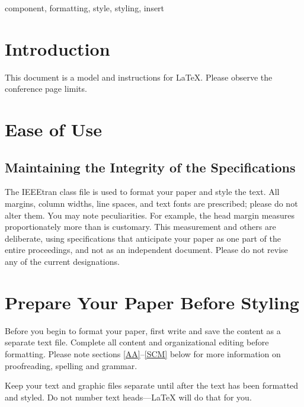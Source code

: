 \documentclass[conference]{IEEEtran}
\begin{document}
\begin{abstract}
    This document is a model and instructions for \LaTeX.
    This and the IEEEtran.cls file define the components of your paper [title, text, heads, etc.]. *CRITICAL: Do Not Use Symbols, Special Characters, Footnotes,
    or Math in Paper Title or Abstract.
\end{abstract}

\begin{IEEEkeywords}
    component, formatting, style, styling, insert
\end{IEEEkeywords}

\section{Introduction}
This document is a model and instructions for \LaTeX. Please observe the
conference page limits.

\section{Ease of Use}

\subsection{Maintaining the Integrity of the Specifications}

The IEEEtran class file is used to format your paper and style the text. All
margins, column widths, line spaces, and text fonts are prescribed; please do
not alter them. You may note peculiarities. For example, the head margin
measures proportionately more than is customary. This measurement and others
are deliberate, using specifications that anticipate your paper as one part of
the entire proceedings, and not as an independent document. Please do not
revise any of the current designations.

\section{Prepare Your Paper Before Styling}
Before you begin to format your paper, first write and save the content as a
separate text file. Complete all content and organizational editing before
formatting. Please note sections \ref{AA}--\ref{SCM} below for more information
on proofreading, spelling and grammar.

Keep your text and graphic files separate until after the text has been
formatted and styled. Do not number text heads---{\LaTeX} will do that for you.
\end{document}
